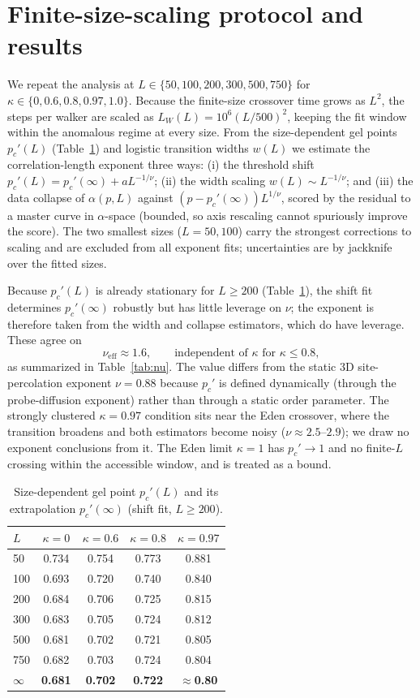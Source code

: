 \documentclass[aps,prl,twocolumn,superscriptaddress,floatfix,nofootinbib]{revtex4-2}
\newcommand{\pcp}{p_c'}
\newcommand{\kap}{\kappa}
\newcommand{\nueff}{\nu_{\mathrm{eff}}}
\begin{document}
\section{Finite-size-scaling protocol and results}
We repeat the analysis at $L\in\{50,100,200,300,500,750\}$ for $\kap\in\{0,0.6,0.8,0.97,1.0\}$.
Because the finite-size crossover time grows as $L^2$, the steps per walker are scaled as
$L_W(L)=10^6(L/500)^2$, keeping the fit window within the anomalous regime at every size. From the
size-dependent gel points $\pcp(L)$ (Table~\ref{tab:pcL}) and logistic transition widths $w(L)$ we
estimate the correlation-length exponent three ways: (i) the threshold shift
$\pcp(L)=\pcp(\infty)+aL^{-1/\nu}$; (ii) the width scaling $w(L)\sim L^{-1/\nu}$; and (iii) the data
collapse of $\alpha(p,L)$ against $(p-\pcp(\infty))L^{1/\nu}$, scored by the residual to a master
curve in $\alpha$-space (bounded, so axis rescaling cannot spuriously improve the score). The two
smallest sizes ($L=50,100$) carry the strongest corrections to scaling and are excluded from all
exponent fits; uncertainties are by jackknife over the fitted sizes.

Because $\pcp(L)$ is already stationary for $L\ge200$ (Table~\ref{tab:pcL}), the shift fit
determines $\pcp(\infty)$ robustly but has little leverage on $\nu$; the exponent is therefore taken
from the width and collapse estimators, which do have leverage. These agree on
\begin{equation}
  \nueff\approx1.6, \qquad \text{independent of } \kap \text{ for } \kap\le0.8,
\end{equation}
as summarized in Table~\ref{tab:nu}. The value differs from the static 3D site-percolation exponent
$\nu=0.88$ because $\pcp$ is defined dynamically (through the probe-diffusion exponent) rather than
through a static order parameter. The strongly clustered $\kap=0.97$ condition sits near the Eden
crossover, where the transition broadens and both estimators become noisy ($\nu\approx2.5$--$2.9$);
we draw no exponent conclusions from it. The Eden limit $\kap=1$ has $\pcp\to1$ and no finite-$L$
crossing within the accessible window, and is treated as a bound.

\begin{table}[h]
\centering
\caption{Size-dependent gel point $\pcp(L)$ and its extrapolation $\pcp(\infty)$
(shift fit, $L\ge200$).}
\label{tab:pcL}
\begin{tabular}{lcccc}
\toprule
$L$ & $\kap=0$ & $\kap=0.6$ & $\kap=0.8$ & $\kap=0.97$ \\
\midrule
50   & 0.734 & 0.754 & 0.773 & 0.881 \\
100  & 0.693 & 0.720 & 0.740 & 0.840 \\
200  & 0.684 & 0.706 & 0.725 & 0.815 \\
300  & 0.683 & 0.705 & 0.724 & 0.812 \\
500  & 0.681 & 0.702 & 0.721 & 0.805 \\
750  & 0.682 & 0.703 & 0.724 & 0.804 \\
\midrule
$\infty$ & \textbf{0.681} & \textbf{0.702} & \textbf{0.722} & \textbf{$\approx$0.80} \\
\bottomrule
\end{tabular}
\end{table}
\end{document}
